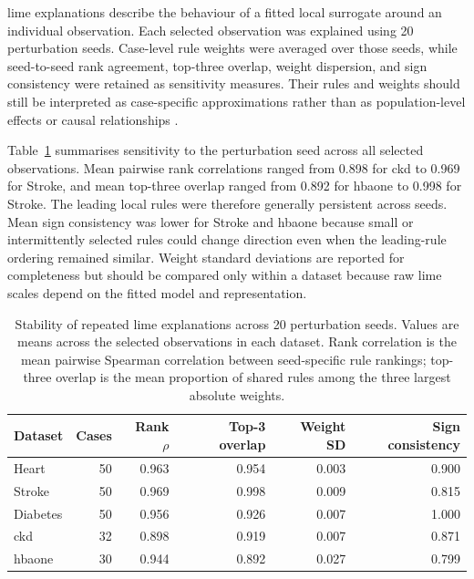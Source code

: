 \gls{lime} explanations describe the behaviour of a fitted local surrogate around an individual observation. Each selected observation was explained using 20 perturbation seeds. Case-level rule weights were averaged over those seeds, while seed-to-seed rank agreement, top-three overlap, weight dispersion, and sign consistency were retained as sensitivity measures. Their rules and weights should still be interpreted as case-specific approximations rather than as population-level effects or causal relationships \citep{ribeiro_why_2016, vilone_classification_2021}.

Table~\ref{tab:lime_seed_stability} summarises sensitivity to the perturbation seed across all selected observations. Mean pairwise rank correlations ranged from 0.898 for \gls{ckd} to 0.969 for Stroke, and mean top-three overlap ranged from 0.892 for \gls{hbaone} to 0.998 for Stroke. The leading local rules were therefore generally persistent across seeds. Mean sign consistency was lower for Stroke and \gls{hbaone} because small or intermittently selected rules could change direction even when the leading-rule ordering remained similar. Weight standard deviations are reported for completeness but should be compared only within a dataset because raw \gls{lime} scales depend on the fitted model and representation.

\begin{table}[htbp]
    \centering
    \small
    \caption{Stability of repeated \gls{lime} explanations across 20 perturbation seeds. Values are means across the selected observations in each dataset. Rank correlation is the mean pairwise Spearman correlation between seed-specific rule rankings; top-three overlap is the mean proportion of shared rules among the three largest absolute weights.}
    \label{tab:lime_seed_stability}
    \begin{tabular}{@{}lrrrrr@{}}
        \toprule
        \textbf{Dataset} & \textbf{Cases} & \textbf{Rank $\rho$} & \textbf{Top-3 overlap} & \textbf{Weight SD} & \textbf{Sign consistency} \\
        \midrule
        Heart & 50 & 0.963 & 0.954 & 0.003 & 0.900 \\
        Stroke & 50 & 0.969 & 0.998 & 0.009 & 0.815 \\
        Diabetes & 50 & 0.956 & 0.926 & 0.007 & 1.000 \\
        \gls{ckd} & 32 & 0.898 & 0.919 & 0.007 & 0.871 \\
        \gls{hbaone} & 30 & 0.944 & 0.892 & 0.027 & 0.799 \\
        \bottomrule
    \end{tabular}
\end{table}

